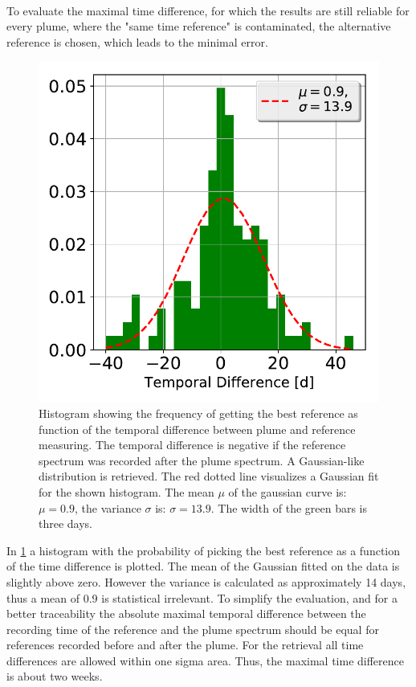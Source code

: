 \\
To evaluate the maximal time difference, for which the results are still reliable for every plume, where the "same time reference" is contaminated, the alternative reference is chosen, which leads to the minimal  error.\\
\begin{figure}
	\centering
	\includegraphics[width=0.6\linewidth]{Bilder/Hist}
	\caption[Histogram showing the frequency of getting the best reference as function of the temporal difference between plume and reference measuring.]{Histogram showing the frequency of getting the best reference as function of the temporal difference between plume and reference measuring. The temporal difference is negative if the reference spectrum was recorded after the plume spectrum. A Gaussian-like distribution is retrieved. The red dotted line visualizes a Gaussian fit for the shown histogram. The mean $\mu$ of the gaussian curve is: $\mu = 0.9$, the variance $\sigma$ is: $\sigma = 13.9$. The width of the green bars is three days.}
	\label{fig:Hist}
\end{figure}
%
In \cref{fig:Hist} a histogram with the probability of picking the best reference as a function of the time difference is plotted. The mean of the Gaussian fitted on the data is slightly above zero. However the variance is calculated as approximately 14 days, thus a mean of 0.9 is statistical irrelevant. To simplify the evaluation, and for a better traceability the absolute maximal temporal difference between the recording time of the reference and the plume spectrum should be equal for references recorded before and after the plume. For the retrieval all time differences are allowed within one sigma area. Thus, the maximal time difference is about two weeks.\\

